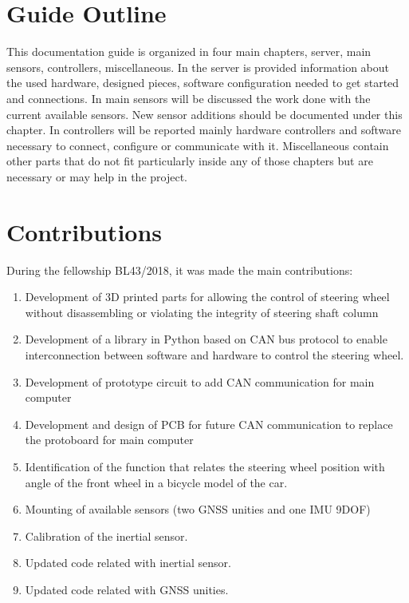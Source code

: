 \section{Guide Outline}
\label{section:outline} 

This documentation guide is organized in four main chapters, server, main sensors, controllers, miscellaneous.
In the server is provided information about the used hardware, designed pieces, software configuration needed to get started and connections.
In main sensors will be discussed the work done with the current available sensors. New sensor additions should be documented under this chapter.
In controllers will be reported mainly hardware controllers and software necessary to connect, configure  or communicate with it.
Miscellaneous contain other parts that do not fit particularly inside any of those chapters but are necessary or may help in the project.

 

\section{Contributions}
\label{section:contributions}

During the fellowship BL43/2018, it was made the main contributions:
\begin{enumerate}
	\tightlist
	\item Development of 3D printed parts for allowing the control of steering wheel without disassembling or violating the integrity of steering shaft column
	\item Development of a library in Python based on CAN bus protocol to enable interconnection between software and hardware to control the steering wheel.
	\item Development of prototype circuit to add CAN communication for main computer
	\item Development and design of \acrshort{PCB} for future CAN communication to replace the protoboard for main computer
	\item Identification of the function that relates the steering wheel position with angle of the front wheel in a bicycle model of the car.
	\item Mounting of available sensors (two  \acrshort{GNSS} unities and one \acrshort{IMU} \acrshort{9DOF})
	\item Calibration of the inertial sensor.
	\item Updated code related with inertial sensor.
	\item Updated code related with \acrshort{GNSS} unities.
\end{enumerate}


